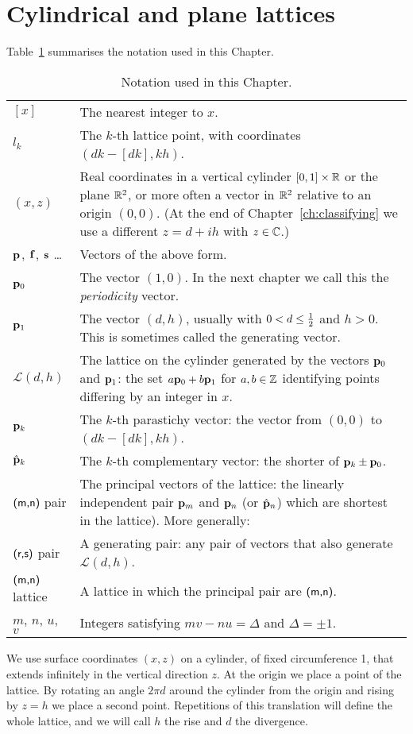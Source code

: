 \section{Cylindrical and plane lattices}
Table~\ref{tab:notation} summarises the notation used in this Chapter. 
\begin{table}
	\begin{tabular}{ll}
		\hline
		$[x]$ & The nearest integer to $x$. 
		\\
	$l_k$ & The $k$-th lattice point, with coordinates $(dk - [dk],kh)$. 
		\\
		$(x,z)$ & Real coordinates in a vertical cylinder $[0,1]\times\mathbb{R}$ or the plane $\mathbb{R}^2$, or more often a vector in $\mathbb{R}^2$ relative to an origin $(0,0)$. (At the end of Chapter~\ref{ch:classifying} we use a different $z=d+ih$ with $z\in\mathbb{C}$.)
		\\
		${\mathbf p}_{}$, $\mathbf{f}$, $\mathbf{s}$ \ldots & Vectors of the above form.
		\\
		${\mathbf p}_{0}$ & The vector $(1,0)$. In the next chapter we call this the \textit{periodicity} vector.
		\\
		${\mathbf p}_{1}$ & The vector $(d,h)$, usually with $0< d\leq \textstyle{\frac{1}{2}}$ and $h>0$. This is sometimes called the generating vector. 
\\
		$\mathcal{L}(d,h)$ & The lattice on the cylinder generated by the vectors ${\mathbf p}_{0}$ and ${\mathbf p}_{1}$:	the set $a{\mathbf p}_{0}+b{\mathbf p}_{1}$ for $a,b\in \mathbb{Z}$ identifying points differing by an integer in $x$. 
		\\
		${\mathbf p}_{k}$ & The $k$-th parastichy vector: the vector from $(0,0)$ to $(dk-[dk],kh)$.
		\\
		$\hat{\mathbf p}_{k}$ & The $k$-th complementary vector: the shorter of ${\mathbf p}_{k}\pm{\mathbf p}_{0}$.
		\\
		$\textsf{(m,n)}$ pair & The principal vectors of the lattice: the linearly independent pair $	{\mathbf p}_{m}$ and ${\mathbf p}_{n}$ (or $\hat{\mathbf p}_{n}$)  which are shortest in the lattice). More generally:
		\\
		$\textsf{(r,s)}$ pair & A generating pair: any pair of vectors that also generate $\mathcal{L}(d,h)$.
		\\
		$\textsf{(m,n)}$ lattice & A lattice in which the principal pair 
		are $\textsf{(m,n)}$.
		\\
		$m$, $n$, $u$, $v$ & Integers satisfying $m v- n u=\Delta$ and $\Delta=\pm 1$.
		\\\hline
	\end{tabular}
	\caption{Notation used in this Chapter.}
	\label{tab:notation}
\end{table}
\clearpage
\label{sec:latticedef}
We use surface coordinates $(x,z)$ on a cylinder, of fixed circumference 1, that extends infinitely in the vertical direction $z$.  At the origin we place a point of the lattice. By rotating an angle $2\pi d$ around the cylinder from the origin and rising by $z=h$
we place a second point. Repetitions of this translation will define the whole lattice,  and we will call  
$h$ the {rise} and $d$ the divergence. 



